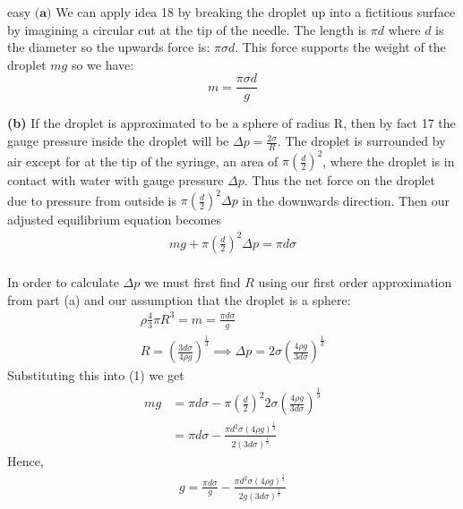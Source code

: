 \begin{solution}{easy}
$\textbf{(a)}$ We can apply idea 18 by breaking the droplet up into a fictitious surface by imagining a circular cut at the tip of the needle. The length is $\pi d$ where $d$ is the diameter so the upwards force is: $\pi \sigma d$. This force supports the weight of the droplet $mg$ so we have:
$$m = \frac{\pi \sigma d}{g}$$
\vspace{3mm}

\noindent \textbf{(b)} If the droplet is approximated to be a sphere of radius R, then by fact 17 the gauge pressure inside the droplet will be $\Delta p = \frac{2 \sigma}{R}$.  The droplet is surrounded by air except for at the tip of the syringe, an area of $\pi \left(\frac{d}{2}\right)^2$, where the droplet is in contact with water with gauge pressure $\Delta p$.  Thus the net force on the droplet due to pressure from outside is $\pi \left(\frac{d}{2}\right)^2 \Delta p$ in the downwards direction.
Then our adjusted equilibrium equation becomes
\begin{align*}
mg + \pi \left(\frac{d}{2}\right)^2 \Delta p = \pi d \sigma
\end{align*}
\\
In order to calculate $\Delta p$ we must first find $R$ using our first order approximation from part (a) and our assumption that the droplet is a sphere:
\begin{align*}
\rho \frac{4}{3} \pi R^3 = m = \frac{\pi d \sigma}{g} \\
R = \left( \frac{3d\sigma}{4\rho g} \right)^{\frac{1}{3}} \implies 
\Delta p  = 2 \sigma \left(\frac{4\rho g}{3 d \sigma}\right)^{\frac{1}{3}}
\end{align*}
Substituting this into (1) we get
\begin{align*}
mg &= \pi d \sigma - \pi \left(\frac{d}{2}\right)^2 2 \sigma \left(\frac{4\rho g}{3 d \sigma}\right)^{\frac{1}{3}} \\
&= \pi d \sigma - \frac{\pi d^2 \sigma (4 \rho g)^{\frac{1}{3}}}{2 (3 d \sigma)^{\frac{1}{3}}} 
\end{align*}
Hence,
\begin{align*}
g = \frac{\pi d \sigma}{g} - \frac{\pi d^2 \sigma (4 \rho g)^{\frac{1}{3}}}{2g (3 d \sigma)^{\frac{1}{3}}} 
\end{align*}
\end{solution}
